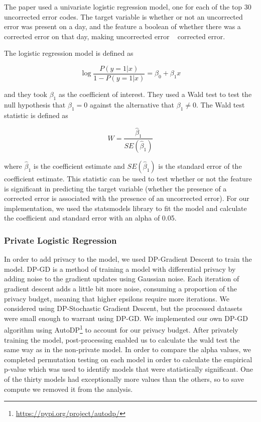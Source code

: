 \documentclass[12pt,letterpaper]{article}
\begin{document}
The paper used a univariate logistic regression model, one for each of the top 30 uncorrected error codes.
The target variable is whether or not an uncorrected error was present on a day, 
and the feature a boolean of whether there was a corrected error on that day, 
making uncorrected error ~ corrected error.

The logistic regression model is defined as 

\begin{equation}
    \label{eq:logistic_regression}
    \log \frac{P(y=1|x)}{1-P(y=1|x)} = \beta_0 + \beta_1 x
\end{equation}

and they took $\beta_1$ as the coefficient of interest.
They used a Wald test to test the null hypothesis that $\beta_1 = 0$ against the alternative that $\beta_1 \neq 0$.
The Wald test statistic is defined as 

\begin{equation}
    \label{eq:wald_test}
    W = \frac{\hat{\beta}_1}{SE(\hat{\beta}_1)}
\end{equation}

where $\hat{\beta}_1$ is the coefficient estimate and $SE(\hat{\beta}_1)$ is the standard error of the coefficient estimate.
This statistic can be used to test whether or not the feature is significant in predicting the target variable (whether the presence of a corrected error is associated with the presence of an uncorrected error).
For our implementation, we used the statsmodels library to fit the model and calculate the coefficient and standard error with an alpha of 0.05.

\subsubsection{Private Logistic Regression}

In order to add privacy to the model, we used DP-Gradient Descent to train the model.
DP-GD is a method of training a model with differential privacy by adding noise to the gradient updates using Gaussian noise.
Each iteration of gradient descent adds a little bit more noise, consuming a proportion of the privacy budget, 
meaning that higher epsilons require more iterations.
We considered using DP-Stochastic Gradient Descent, but the processed datasets were small enough to warrant using DP-GD.
We implemented our own DP-GD algorithm using AutoDP\footnote{\url{https://pypi.org/project/autodp/}} to account for our privacy budget.
After privately training the model, post-processing enabled us to calculate the wald test the same way as in the non-private model.
In order to compare the alpha values, we completed permutation testing on each model in order to calculate the empirical p-value which was used to identify models that were statistically significant.
One of the thirty models had exceptionally more values than the others, so to save compute we removed it from the analysis.
\end{document}
